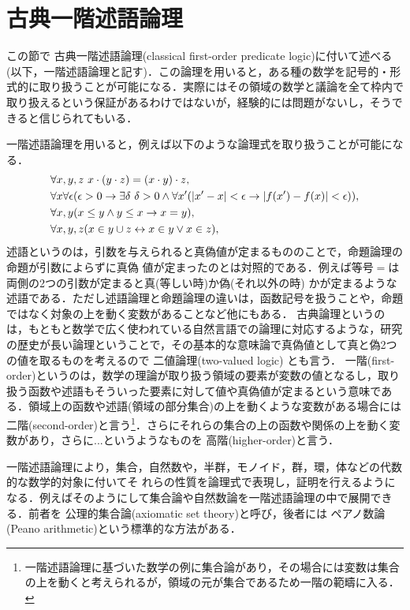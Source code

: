 \documentclass{ltjsarticle}
\theoremstyle{mystyle1}
\theoremstyle{mystyle3}
\theoremstyle{mystyle2}
\newcommand{\red}[1]{{\color{red} #1}}
\begin{document}
\section{古典一階述語論理}
この節で\red{古典一階述語論理}(classical first-order predicate logic)に付いて述べる(以下，一階述語論理と記す)．この論理を用いると，ある種の数学を記号的・形式的に取り扱うことが可能になる．実際にはその領域の数学と議論を全て枠内で取り扱えるという保証があるわけではないが，経験的には問題がないし，そうできると信じられてもいる．

一階述語論理を用いると，例えば以下のような論理式を取り扱うことが可能になる．
\begin{align}
   & \forall x,y,z\ x\cdot\qty(y\cdot z) = (x\cdot y)\cdot z,                                                                                                           \\
   & \forall x\forall\epsilon\qty(\epsilon>0\to\exists\delta\ \delta>0\wedge\forall x^\prime\qty(\qty|x^\prime-x|<\epsilon\to\qty|f\qty(x^\prime)-f\qty(x)|<\epsilon)), \\
   & \forall x,y\qty(x\leq y\wedge y\leq x\to x=y),                                                                                                                     \\
   & \forall x,y,z\qty(x\in y\cup z\leftrightarrow x\in y\vee x\in z),
\end{align}
\red{述語}というのは，引数を与えられると真偽値が定まるもののことで，命題論理の命題が引数によらずに真偽 値が定まったのとは対照的である．例えば等号$=$は両側の2つの引数が定まると真(等しい時)か偽(それ以外の時) かが定まるような述語である．ただし述語論理と命題論理の違いは，函数記号を扱うことや，命題ではなく対象の上を動く変数があることなど他にもある．\red{古典}論理というのは，もともと数学で広く使われている自然言語での論理に対応するような，研究の歴史が長い論理ということで，その基本的な意味論で真偽値として真と偽2つの値を取るものを考えるので\red{二値論理}(two-valued logic) とも言う．\red{一階}(first-order)というのは，数学の理論が取り扱う領域の要素が変数の値となるし，取り扱う函数や述語もそういった要素に対して値や真偽値が定まるという意味である．領域上の函数や述語(領域の部分集合)の上を動くような変数がある場合には\red{二階}(second-order)と言う\footnote{一階述語論理に基づいた数学の例に集合論があり，その場合には変数は集合の上を動くと考えられるが，領域の元が集合であるため一階の範疇に入る．}．さらにそれらの集合の上の函数や関係の上を動く変数があり，さらに...というようなものを\red{高階}(higher-order)と言う．

一階述語論理により，集合，自然数や，半群，モノイド，群，環，体などの代数的な数学的対象に付いてそ れらの性質を論理式で表現し，証明を行えるようになる．例えばそのようにして集合論や自然数論を一階述語論理の中で展開できる．前者を\red{公理的集合論}(axiomatic set theory)と呼び，後者には\red{ペアノ数論}(Peano arithmetic)という標準的な方法がある．
\end{document}
